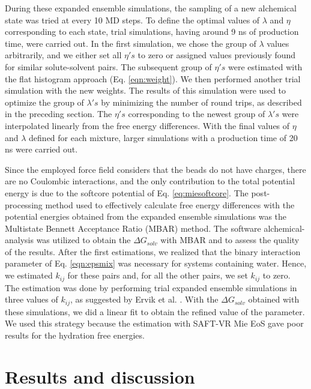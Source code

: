 \documentclass[final,12p,times,twocolumn]{elsarticle}
\begin{document}
	During these expanded ensemble simulations, the sampling of a new alchemical state was tried at every 10 MD steps. To define the optimal values of $\lambda$ and $\eta$ corresponding to each state, trial simulations, having around 9 ns of production time, were carried out. In the first simulation, we chose the group of $\lambda$ values arbitrarily, and we either set all $\eta 's$ to zero or assigned values previously found for similar solute-solvent pairs. The subsequent group of $\eta 's$ were estimated with the flat histogram approach (Eq. \ref{eqn:weight}). We then performed another trial simulation with the new weights. The results of this simulation were used to optimize the group of $\lambda 's$ by minimizing the number of round trips, as described in the preceding  section. The $\eta 's$ corresponding to the newest group of $\lambda 's$ were interpolated linearly from the free energy differences. With the final values of $\eta$ and $\lambda $ defined for each mixture, larger simulations with a production time of 20 ns were carried out.  
	
	Since the employed force field considers that the beads do not have charges, there are no Coulombic interactions, and the only contribution to the total potential energy is due to the softcore potential of Eq. \ref{eq:miesoftcore}. The post-processing method used to effectively calculate free energy differences with the potential energies obtained from the expanded ensemble simulations was the Multistate Bennett Acceptance Ratio (MBAR) method. The software alchemical-analysis \cite{klimovich} was utilized to obtain the $\Delta G_{solv}$ with MBAR and to assess the quality of the results. After the first estimations, we realized that the binary interaction parameter of Eq. \ref{eqn:epsmix} was necessary for systems containing water. Hence, we estimated  $k_{ij}$ for these pairs and, for all the other pairs, we set  $k_{ij}$ to zero. The estimation was done by performing trial expanded ensemble simulations in three values of $k_{ij}$, as suggested by Ervik et al. \cite{ervik20162}. With the $\Delta G_{solv}$ obtained with these simulations, we did a linear fit to obtain the refined value of the parameter. We used this strategy because the estimation with SAFT-VR Mie EoS gave poor results for the hydration free energies.
	
	\section{Results and discussion}
	
\end{document}
